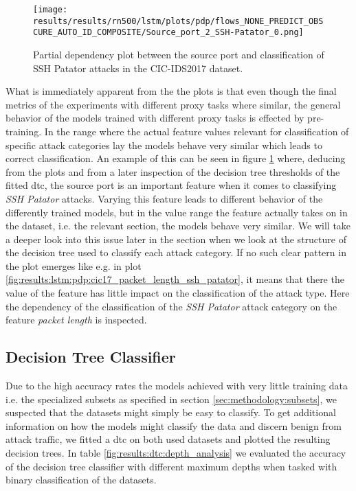 \begin{figure}[h]
	\centering
	\texttt{[image: results/results/rn500/lstm/plots/pdp/flows\_NONE\_PREDICT\_OBSCURE\_AUTO\_ID\_COMPOSITE/Source\_port\_2\_SSH-Patator\_0.png]}
	\caption{Partial dependency plot between the source port and classification of SSH Patator attacks in the CIC-IDS2017 dataset.}
	\label{fig:results:lstm:pdp:cic17_source_port_ssh_patator}
\end{figure}

What is immediately apparent from the the plots is that even though the final metrics of the experiments with different proxy tasks where similar, the general behavior of the models trained with different proxy tasks is effected by pre-training. In the range where the actual feature values relevant for classification of specific attack categories lay the models behave very similar which leads to correct classification. An example of this can be seen in figure \ref{fig:results:lstm:pdp:cic17_source_port_ssh_patator} where, deducing from the plots and from a later inspection of the decision tree thresholds of the fitted \gls{dtc}, the source port is an important feature when it comes to classifying \textit{SSH Patator} attacks. Varying this feature leads to different behavior of the differently trained models, but in the value range the feature actually takes on in the dataset, i.e. the relevant section, the models behave very similar. We will take a deeper look into this issue later in the section when we look at the structure of the decision tree used to classify each attack category. If no such clear pattern in the plot emerges like e.g. in plot \ref{fig:results:lstm:pdp:cic17_packet_length_ssh_patator}, it means that there the value of the feature has little impact on the classification of the attack type. Here the dependency of the classification of the \textit{SSH Patator} attack category on the feature \textit{packet length} is inspected.

\FloatBarrier

\subsection{Decision Tree Classifier} \label{sec:results:explainability:dtc}

Due to the high accuracy rates the models achieved with very little training data i.e. the specialized subsets as specified in section \ref{sec:methodology:subsets}, we suspected that the datasets might simply be easy to classify. To get additional information on how the models might classify the data and discern benign from attack traffic, we fitted a \gls{dtc} on both used datasets and plotted the resulting decision trees. In table \ref{fig:results:dtc:depth_analysis} we evaluated the accuracy of the decision tree classifier with different maximum depths when tasked with binary classification of the datasets. 

